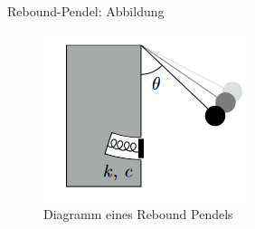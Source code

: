 \begin{frame}{Rebound-Pendel: Abbildung}
    \begin{figure}
        \centering
        \includegraphics{images/rebound_pendulum_diagram}
        \caption{Diagramm eines Rebound Pendels\cite[6]{flamantSolvingDifferentialEquations2020}}
        \label{fig:rebound_pendulum_diagram}
    \end{figure}
\end{frame}

